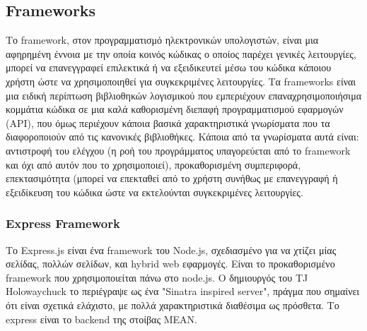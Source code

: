 	\subsection{Frameworks}
	
		Το framework, στον προγραμματισμό ηλεκτρονικών υπολογιστών, είναι μια αφηρημένη έννοια με την οποία κοινός κώδικας ο οποίος παρέχει γενικές λειτουργίες, μπορεί να επανεγγραφεί επιλεκτικά ή να εξειδικευτεί μέσω του κώδικα κάποιου χρήστη ώστε να χρησιμοποιηθεί για συγκεκριμένες λειτουργίες. Τα frameworks είναι μια ειδική περίπτωση βιβλιοθηκών λογισμικού που εμπεριέχουν επαναχρησιμοποιήσιμα κομμάτια κώδικα σε μια καλά καθορισμένη διεπαφή προγραμματισμού εφαρμογών (API), που όμως περιέχουν κάποια βασικά χαρακτηριστικά γνωρίσματα που τα διαφοροποιούν από τις κανονικές βιβλιοθήκες. Κάποια από τα γνωρίσματα αυτά είναι: αντιστροφή του ελέγχου (η ροή του προγράμματος υπαγορεύεται από το framework και όχι από αυτόν που το χρησιμοποιεί), προκαθορισμένη συμπεριφορά, επεκτασιμότητα (μπορεί να επεκταθεί από το χρήστη συνήθως με επανεγγραφή  ή εξειδίκευση του κώδικα ώστε να εκτελούνται συγκεκριμένες λειτουργίες. \cite{Framework}

	
		\subsubsection{Express Framework}

		Το Express.js είναι ένα framework του Node.js, σχεδιασμένο για να χτίζει μίας σελίδας, πολλών σελίδων, και hybrid web εφαρμογές. Είναι το προκαθορισμένο framework που χρησιμοποιείται πάνω στο node.js.  Ο δημιουργός του TJ Holowaychuck το περιέγραψε ως ένα "Sinatra inspired server", πράγμα που σημαίνει ότι είναι σχετικά ελάχιστο, με πολλά χαρακτηριστικά διαθέσιμα ως πρόσθετα. Το express είναι το backend της στοίβας MEAN.
		
